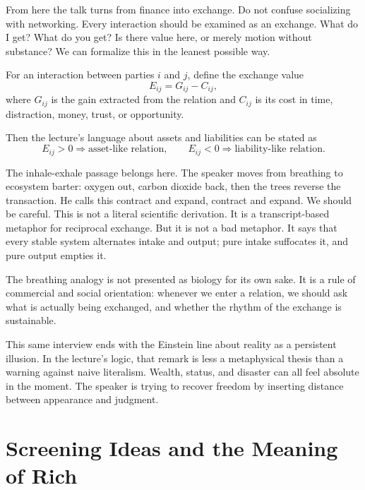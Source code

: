 From here the talk turns from finance into exchange. Do not confuse socializing with networking. Every interaction should be examined as an exchange. What do I get? What do you get? Is there value here, or merely motion without substance? We can formalize this in the leanest possible way.

\begin{definition}
For an interaction between parties \(i\) and \(j\), define the exchange value
\begin{equation}
E_{ij}=G_{ij}-C_{ij},
\end{equation}
where \(G_{ij}\) is the gain extracted from the relation and \(C_{ij}\) is its cost in time, distraction, money, trust, or opportunity.
\end{definition}

Then the lecture's language about assets and liabilities can be stated as
\begin{equation}
E_{ij}>0 \Rightarrow \text{asset-like relation}, \qquad
E_{ij}<0 \Rightarrow \text{liability-like relation}.
\end{equation}

The inhale-exhale passage belongs here. The speaker moves from breathing to ecosystem barter: oxygen out, carbon dioxide back, then the trees reverse the transaction. He calls this contract and expand, contract and expand. We should be careful. This is not a literal scientific derivation. It is a transcript-based metaphor for reciprocal exchange. But it is not a bad metaphor. It says that every stable system alternates intake and output; pure intake suffocates it, and pure output empties it.

\begin{remark}
The breathing analogy is not presented as biology for its own sake. It is a rule of commercial and social orientation: whenever we enter a relation, we should ask what is actually being exchanged, and whether the rhythm of the exchange is sustainable.
\end{remark}

This same interview ends with the Einstein line about reality as a persistent illusion. In the lecture's logic, that remark is less a metaphysical thesis than a warning against naive literalism. Wealth, status, and disaster can all feel absolute in the moment. The speaker is trying to recover freedom by inserting distance between appearance and judgment.

\section{Screening Ideas and the Meaning of Rich}

